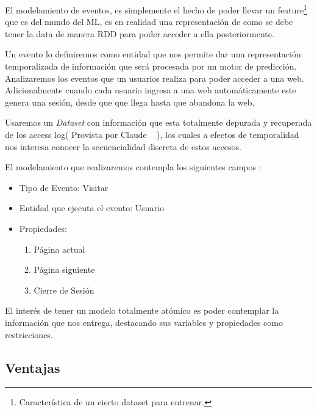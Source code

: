   El modelamiento de eventos, es simplemente el hecho de poder llevar un feature\footnote{Característica de un cierto dataset para entrenar.}   que es del mundo del ML, es en realidad una representación de como se debe tener la data de manera RDD para poder acceder a ella posteriormente. 

  Un evento lo definiremos como entidad que nos permite dar una representación temporalizada de información que será procesada por un motor de predicción. Analizaremos los eventos que un usuarios realiza para poder acceder a una web. Adicionalmente cuando cada usuario ingresa a una web automáticamente este genera una sesión, desde que que llega hasta que abandona la web.

  Usaremos un \emph{Dataset} con información que esta totalmente depurada y recuperada de los access log( Provista por Claude \etal~\cite{Claude2014} ), los cuales a efectos de temporalidad nos interesa conocer la secuencialidad discreta de estos accesos.
  



  El modelamiento que realizaremos contempla los siguientes campos :


    \begin{itemize}
    		\setlength{\itemsep}{1pt}
    		\setlength{\parskip}{0pt}
    		\setlength{\parsep}{0pt}
      \item Tipo de Evento: Visitar
      \item Entidad que ejecuta el evento: Usuario
      \item Propiedades:
          \begin{enumerate}
          		\setlength{\itemsep}{1pt}
          		\setlength{\parskip}{0pt}
          		\setlength{\parsep}{0pt}
            \item Página actual
            \item Página siguiente
            \item Cierre de Sesión
          \end{enumerate}
    \end{itemize}



    El interés de tener un modelo totalmente atómico es poder contemplar la información que nos entrega, destacando sus variables y propiedades como restricciones.



\subsection{Ventajas }


